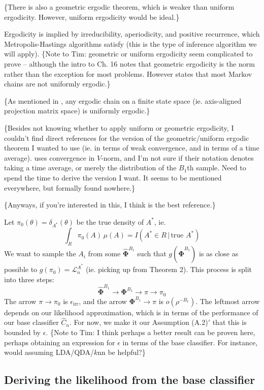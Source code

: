 \documentclass[ejs,preprint]{imsart}
\newcommand\risk{\mathcal{L}}
\begin{document}
\{There is also a geometric ergodic theorem, which is weaker than uniform ergodicity. However, uniform ergodicity would be ideal.\}

Ergodicity is implied by irreducibility, aperiodicity, and positive recurrence, which Metropolis-Hastings algorithms satisfy (this is the type of inference algorithm we will apply). \{Note to Tim: geometric or uniform ergodicity seem complicated to prove -- although the intro to \cite{MT93} Ch. 16 notes that geometric ergodicity is the norm rather than the exception for most problems. However \cite{Geyer12} states that most Markov chains are not uniformly ergodic.\}

\{As mentioned in \cite{Sarig08}, any ergodic chain on a finite state space (ie. axis-aligned projection matrix space) is uniformly ergodic.\}

\{Besides not knowing whether to apply uniform or geometric ergodicity, I couldn't find direct references for the version of the geometric/uniform ergodic theorem I wanted to use (ie. in terms of weak convergence, and in terms of a time average). \cite{MT93} uses convergence in $V$-norm, and I'm not sure if their notation denotes taking a time average, or merely the distribution of the $B_1$th sample. Need to spend the time to derive the version I want. It seems to be mentioned everywhere, but formally found nowhere.\}

\{Anyways, if you're interested in this, I think \cite{Geyer12} is the best reference.\}

Let $\pi_0(\theta)=\delta_{A^*}(\theta)$ be the true density of $A^*$, ie.
\[
\int_R\!\pi_0(A)\,\mu(A)=I(A^*\in R\,|\,\text{true }A^*)
\]
We want to sample the $A_i$ from some $\hat{\bm{\Phi}}^{B_1}$ such that $g(\hat{\bm{\Phi}}^{B_1})$ is as close as possible to $g(\pi_0)=\risk_n^{A^*}$ (ie. picking up from Theorem 2). This process is split into three steps:
\[
\hat{\bm{\Phi}}^{B_1} \to \bm{\Phi}^{B_1} \to \pi \to \pi_0
\]
The arrow $\pi\to\pi_0$ is $\epsilon_\mathrm{irr}$, and the arrow $\bm{\Phi}^{B_1}\to\pi$ is $o(\rho^{-B_1})$. The leftmost arrow depends on our likelihood approximation, which is in terms of the performance of our base classifier $\hat C_n$. For now, we make it our Assumption (A.2)$'$ that this is bounded by $\epsilon$. \{Note to Tim: I think perhaps a better result can be proven here, perhaps obtaining an expression for $\epsilon$ in terms of the base classifier. For instance, would assuming LDA/QDA/$k$nn be helpful?\}

\subsection{Deriving the likelihood from the base classifier}
\end{document}
